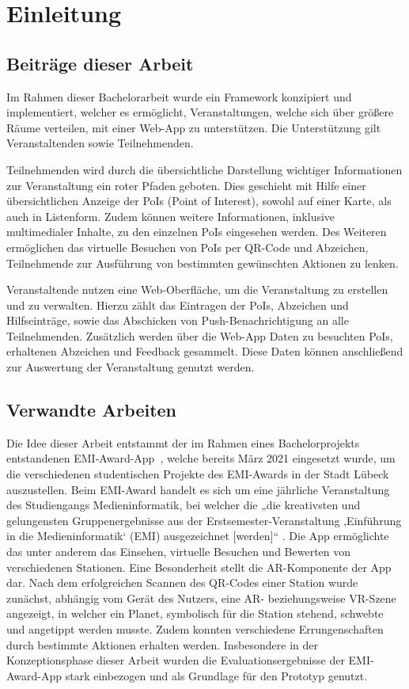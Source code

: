\chapter{Einleitung}



\section{Beiträge dieser Arbeit}

Im Rahmen dieser Bachelorarbeit wurde ein Framework konzipiert und
implementiert, welcher es ermöglicht, Veranstaltungen, welche sich über größere
Räume verteilen, mit einer Web-App zu unterstützen. Die Unterstützung gilt
Veranstaltenden sowie Teilnehmenden.

Teilnehmenden wird durch die übersichtliche Darstellung wichtiger Informationen
zur Veranstaltung ein roter Pfaden geboten. Dies geschieht mit Hilfe einer
übersichtlichen Anzeige der PoIs (Point of Interest), sowohl auf einer Karte,
als auch in Listenform. Zudem können weitere Informationen, inklusive
multimedialer Inhalte, zu den einzelnen PoIs eingesehen werden. Des Weiteren
ermöglichen das virtuelle Besuchen von PoIs per QR-Code und Abzeichen,
Teilnehmende zur Ausführung von bestimmten gewünschten Aktionen zu lenken.

Veranstaltende nutzen eine Web-Oberfläche, um die Veranstaltung zu erstellen und
zu verwalten. Hierzu zählt das Eintragen der PoIs, Abzeichen und Hilfseinträge,
sowie das Abschicken von Push-Benachrichtigung an alle Teilnehmenden. Zusätzlich
werden über die Web-App Daten zu besuchten PoIs, erhaltenen Abzeichen und
Feedback gesammelt. Diese Daten können anschließend zur Auswertung der
Veranstaltung genutzt werden.

\section{Verwandte Arbeiten}

Die Idee dieser Arbeit entstammt der im Rahmen eines Bachelorprojekts
entstandenen EMI-Award-App~\cite{Canzler2021}, welche bereits März 2021
eingesetzt wurde, um die verschiedenen studentischen Projekte des EMI-Awards in
der Stadt Lübeck auszustellen. Beim EMI-Award handelt es sich um eine jährliche
Veranstaltung des Studiengangs Medieninformatik, bei welcher die „die
kreativsten und gelungensten Gruppenergebnisse aus der
Erstsemester-Veranstaltung ‚Einführung in die Medieninformatik‘ (EMI)
ausgezeichnet [werden]“ \cite{UniversitatzuLubeck2021}. Die App ermöglichte das
unter anderem das Einsehen, virtuelle Besuchen und Bewerten von verschiedenen
Stationen. Eine Besonderheit stellt die AR-Komponente der App dar. Nach dem
erfolgreichen Scannen des QR-Codes einer Station wurde zunächst, abhängig vom
Gerät des Nutzers, eine AR- beziehungsweise VR-Szene angezeigt, in welcher ein
Planet, symbolisch für die Station stehend, schwebte und angetippt werden
musste. Zudem konnten verschiedene Errungenschaften durch bestimmte Aktionen erhalten werden. Insbesondere in der Konzeptionsphase dieser Arbeit wurden die
Evaluationsergebnisse der EMI-Award-App stark einbezogen und als Grundlage für
den Prototyp genutzt.

